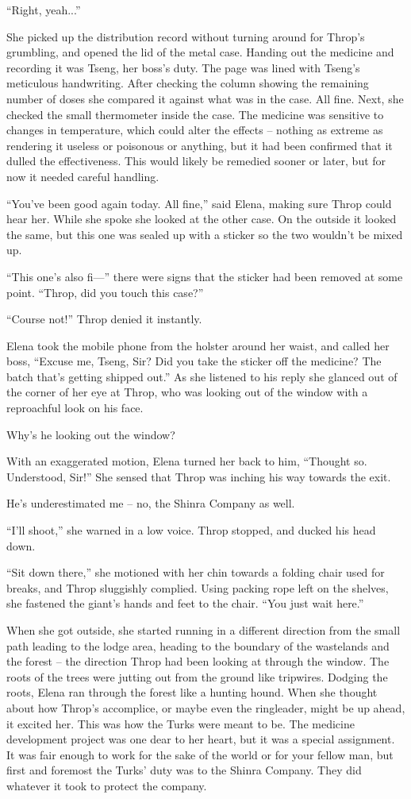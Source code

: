 \documentclass[oneside]{book}
\begin{document}
“Right, yeah...”

She picked up the distribution record without turning around for Throp’s grumbling, and opened the lid of the metal case. Handing out the medicine and recording it was Tseng, her boss’s duty. The page was lined with Tseng’s meticulous handwriting. After checking the column showing the remaining number of doses she compared it against what was in the case. All fine. Next, she checked the small thermometer inside the case. The medicine was sensitive to changes in temperature, which could alter the effects – nothing as extreme as rendering it useless or poisonous or anything, but it had been confirmed that it dulled the effectiveness. This would likely be remedied sooner or later, but for now it needed careful handling.

“You’ve been good again today. All fine,” said Elena, making sure Throp could hear her. While she spoke she looked at the other case. On the outside it looked the same, but this one was sealed up with a sticker so the two wouldn’t be mixed up.

“This one’s also fi—” there were signs that the sticker had been removed at some point. “Throp, did you touch this case?”

“Course not!” Throp denied it instantly.

Elena took the mobile phone from the holster around her waist, and called her boss, “Excuse me, Tseng, Sir? Did you take the sticker off the medicine? The batch that’s getting shipped out.” As she listened to his reply she glanced out of the corner of her eye at Throp, who was looking out of the window with a reproachful look on his face.

Why’s he looking out the window?

With an exaggerated motion, Elena turned her back to him, “Thought so. Understood, Sir!” She sensed that Throp was inching his way towards the exit.

He’s underestimated me – no, the Shinra Company as well.

“I’ll shoot,” she warned in a low voice. Throp stopped, and ducked his head down.

“Sit down there,” she motioned with her chin towards a folding chair used for breaks, and Throp sluggishly complied. Using packing rope left on the shelves, she fastened the giant’s hands and feet to the chair. “You just wait here.”

When she got outside, she started running in a different direction from the small path leading to the lodge area, heading to the boundary of the wastelands and the forest – the direction Throp had been looking at through the window. The roots of the trees were jutting out from the ground like tripwires. Dodging the roots, Elena ran through the forest like a hunting hound. When she thought about how Throp’s accomplice, or maybe even the ringleader, might be up ahead, it excited her. This was how the Turks were meant to be. The medicine development project was one dear to her heart, but it was a special assignment. It was fair enough to work for the sake of the world or for your fellow man, but first and foremost the Turks’ duty was to the Shinra Company. They did whatever it took to protect the company.
\end{document}
